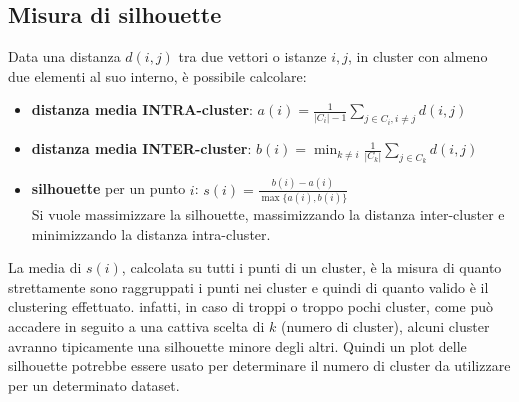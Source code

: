 \subsection{Misura di silhouette}
Data una distanza $d(i,j)$ tra due vettori o istanze $i,j$, in cluster con almeno due elementi al suo interno, è possibile calcolare:
\begin{itemize}
    \item \textbf{distanza media INTRA-cluster}: $a(i) = \displaystyle \frac{1}{|C_i| -1} \sum_{j \in C_i, i \neq j} d(i,j)$
    \item \textbf{distanza media INTER-cluster}: $b(i) = \displaystyle \min_{k \neq i} \frac{1}{|C_k|} \sum_{j \in C_k} d(i,j)$
    \item \textbf{silhouette} per un punto $i$: $s(i) = \displaystyle \frac{b(i) - a(i)}{\max \{a(i), b(i)\}}$\\
        Si vuole massimizzare la silhouette, massimizzando la distanza inter-cluster e minimizzando la distanza intra-cluster.
\end{itemize}
La media di $s(i)$, calcolata su tutti i punti di un cluster, è la misura di quanto strettamente sono raggruppati i punti nei cluster e quindi di quanto valido è il clustering effettuato.
infatti, in caso di troppi o troppo pochi cluster, come può accadere in seguito a una cattiva scelta di $k$ (numero di cluster), alcuni cluster avranno tipicamente una silhouette minore degli altri.
Quindi un plot delle silhouette potrebbe essere usato per determinare il numero di cluster da utilizzare per un determinato dataset.
